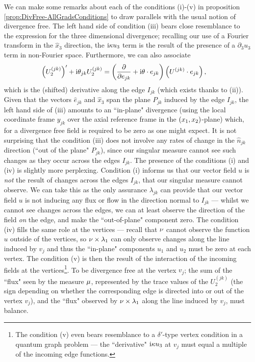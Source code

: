 We can make some remarks about each of the conditions (i)-(v) in proposition \ref{prop:DivFree-AllGradsConditions} to draw parallels with the usual notion of divergence free.
The left hand side of condition (iii) bears close resemblance to the expression for the three dimensional divergence; recalling our use of a Fourier transform in the $\widehat{x}_3$ direction, the $\mathrm{i}\kappa u_3$ term is the result of the presence of a $\partial_3 u_3$ term in non-Fourier space.
Furthermore, we can also associate
\begin{align*}
	\left( U_2^{(jk)} \right)' + \mathrm{i}\theta_{jk}U_2^{(jk)} &= \left( \dfrac{\partial }{\partial e_{jk}} + \mathrm{i}\theta\cdot e_{jk} \right)\left( U^{(jk)}\cdot e_{jk} \right),
\end{align*}
which is the (shifted) derivative along the edge $I_{jk}$ (which exists thanks to (ii)).
Given that the vectors $\widehat{e}_{jk}$ and $\widehat{x}_3$ span the plane $P_{jk}$ induced by the edge $I_{jk}$, the left hand side of (iii) amounts to an ``in-plane" divergence (using the local coordinate frame $y_{jk}$ over the axial reference frame in the $\left( x_1,x_2 \right)$-plane) which, for a divergence free field is required to be zero as one might expect.
It is not surprising that the condition (iii) does not involve any rates of change in the $\hat{n}_{jk}$ direction (``out of the plane" $P_{jk}$), since our singular measure cannot see such changes as they occur across the edges $I_{jk}$.
The presence of the conditions (i) and (iv) is slightly more perplexing.
Condition (i) informs us that our vector field $u$ is \emph{not} the result of changes across the edges $I_{jk}$, that our singular measure cannot observe.
We can take this as the only assurance $\lambda_{jk}$ can provide that our vector field $u$ is not inducing any flux or flow in the direction normal to $I_{jk}$ --- whilst we cannot see changes across the edges, we can at least observe the direction of the field \emph{on} the edge, and make the ``out-of-plane" component zero.
The condition (iv) fills the same role at the vertices --- recall that $\nu$ cannot observe the function $u$ outside of the vertices, so $\nu\times\lambda_1$ can only observe changes along the line induced by $v_j$ and thus the ``in-plane" components $u_1$ and $u_2$ must be zero at each vertex.
The condition (v) is then the result of the interaction of the incoming fields at the vertices\footnote{The condition (v) even bears resemblance to a $\delta'$-type vertex condition in a quantum graph problem --- the ``derivative" $\mathrm{i}\kappa u_3$ at $v_j$ must equal a multiple of the incoming edge functions.}.
To be divergence free at the vertex $v_j$; the sum of the ``flux" seen by the measure $\mu$, represented by the trace values of the $U_2^{(jk)}$ (the sign depending on whether the corresponding edge is directed into or out of the vertex $v_j$), and the ``flux" observed by $\nu\times\lambda_1$ along the line induced by $v_j$, must balance.

